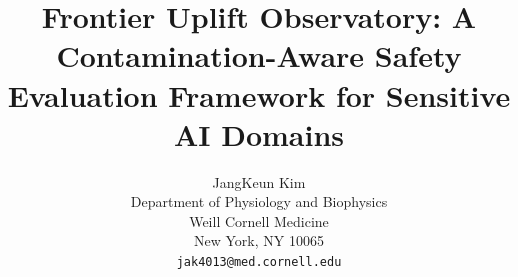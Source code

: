 \documentclass[11pt]{article}
\title{Frontier Uplift Observatory: A Contamination-Aware Safety Evaluation Framework for Sensitive AI Domains}
\author{
  JangKeun Kim \\
  Department of Physiology and Biophysics \\
  Weill Cornell Medicine \\
  New York, NY 10065 \\
  \texttt{jak4013@med.cornell.edu}
}
\begin{document}
\maketitle










\begin{ack}

\end{ack}




\newpage
\appendix


\newpage

\end{document}
